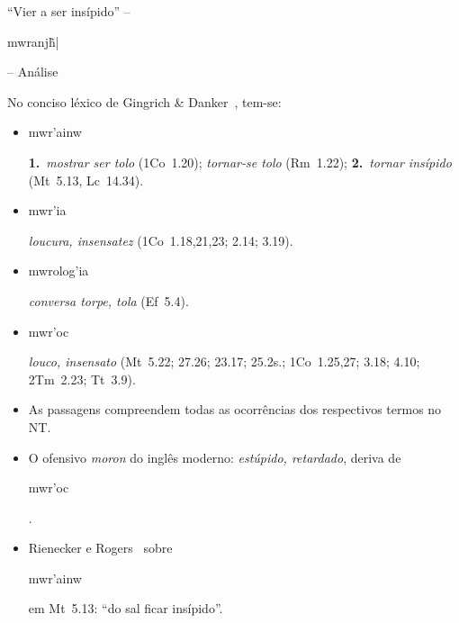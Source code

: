 \documentclass[12pt,aspectratio=169]{beamer}
\newcommand{\YEL}[1]{{\textcolor{TXyel}{#1}}}
\newcommand{\CYA}[1]{{\textcolor{TXcya}{#1}}}
\newcommand{\BRI}[1]{{\textcolor{BSpbg}{#1}}}   %
\newcommand{\GRtxt}[1]{\begin{otherlanguage}{greek}{{#1}}\end{otherlanguage}}
\begin{document}
    \begin{frame}{\BRI{``Vier a ser insípido''} -- \BRI{\GRtxt{mwranj\~h|}} -- \BRI{Análise}}
        No conciso léxico de Gingrich \& Danker~\cite{2007-GingrichFW-VidaNova}, tem-se:
        \\[\medskipamount]
        \begin{itemize}
            \item<1-> \YEL{\GRtxt{mwr'ainw}} \BRI{\bf 1.}~\CYA{\textit{mostrar ser tolo}} (1Co~1.20);
                \CYA{\textit{tornar-se tolo}} (Rm~1.22); \BRI{\bf 2.}~\CYA{\textit{tornar
                insípido}} (Mt~5.13, Lc~14.34).
                \\[\medskipamount]
            \item<2-> \YEL{\GRtxt{mwr'ia}} \CYA{\textit{loucura, insensatez}} (1Co~1.18,21,23;
                2.14; 3.19).
                \\[\medskipamount]
            \item<3-> \YEL{\GRtxt{mwrolog'ia}} \CYA{\textit{conversa torpe, tola}} (Ef~5.4).
                \\[\medskipamount]
            \item<4-> \YEL{\GRtxt{mwr'oc}} \CYA{\textit{louco, insensato}} (Mt~5.22; 27.26;
                23.17; 25.2s.; 1Co~1.25,27; 3.18; 4.10; 2Tm~2.23; Tt~3.9).
                \\[\medskipamount]
            \item<5-> As passagens compreendem \BRI{todas} as ocorrências dos respectivos termos
                no NT.
                \\[\medskipamount]
            \item<6-> O ofensivo \CYA{\textit{moron}} do inglês moderno: \CYA{\textit{estúpido,
                retardado}}, deriva de \YEL{\GRtxt{mwr'oc}}.
                \\[\medskipamount]
            \item<7-> Rienecker e Rogers~\cite{1985-RieneckerF+RogersC-VidaNova} sobre
                \YEL{\GRtxt{mwr'ainw}} em Mt~5.13: \BRI{``do sal ficar insípido''}.
        \end{itemize}
    \end{frame}
\end{document}
